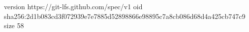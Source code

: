 version https://git-lfs.github.com/spec/v1
oid sha256:2d1b083cd3f072939e7e7885d52898866e98895c7a8cb086d68d4a425cb747c9
size 58

